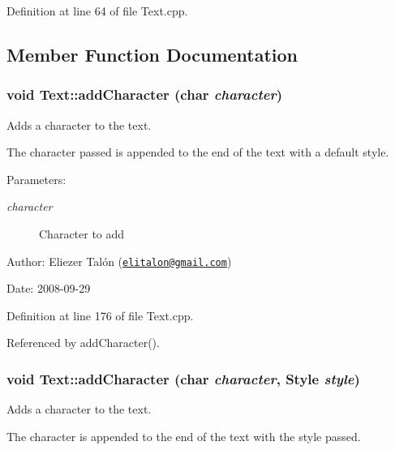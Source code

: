 Definition at line 64 of file Text.cpp.

\subsection{Member Function Documentation}
\hypertarget{class_text_f30df66d8aa08a4e202512a358534f6c}{
\subsubsection[addCharacter]{\setlength{\rightskip}{0pt plus 5cm}void Text::addCharacter (char {\em character})}}
\label{class_text_f30df66d8aa08a4e202512a358534f6c}


Adds a character to the text. 

The character passed is appended to the end of the text with a default style.

\begin{Desc}
\item[Parameters:]
\begin{description}
\item[{\em character}]Character to add\end{description}
\end{Desc}
\begin{Desc}
\item[Author:]Eliezer Talón (\href{mailto:elitalon@gmail.com}{\tt elitalon@gmail.com}) \end{Desc}
\begin{Desc}
\item[Date:]2008-09-29 \end{Desc}


Definition at line 176 of file Text.cpp.

Referenced by addCharacter().\hypertarget{class_text_757b9caa67089198ac99c06391b910bb}{
\subsubsection[addCharacter]{\setlength{\rightskip}{0pt plus 5cm}void Text::addCharacter (char {\em character}, \/  {\bf Style} {\em style})}}
\label{class_text_757b9caa67089198ac99c06391b910bb}


Adds a character to the text. 

The character is appended to the end of the text with the style passed.

